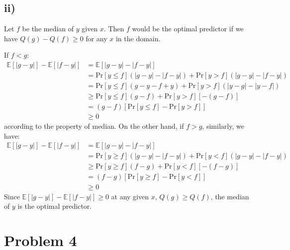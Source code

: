 \documentclass[twoside,11pt]{homework}
\begin{document}
\subsection*{ii)}
Let $f$ be the median of $y$ given $x$.
Then $f$ would be the optimal predictor if we have $Q(g) - Q(f) \ge 0$ for any $x$ in the domain.

If $f < g$:
%
\begin{equation}
\begin{split}
\mathbb{E}[|g-y|] - \mathbb{E}[|f-y|] &=  \mathbb{E}[|g-y| - |f-y|] \\
&= \mathrm{Pr}[y \le f] (|g-y| - |f-y|) + \mathrm{Pr}[y > f] (|g-y| - |f-y|) \\
&= \mathrm{Pr}[y \le f] (g - y - f + y) + \mathrm{Pr}[y > f] (|y-g| - |y-f|) \\
&\ge \mathrm{Pr}[y \le f] (g - f) + \mathrm{Pr}[y > f] [-(g-f)] \\
&= (g-f) [\mathrm{Pr}[y \le f]  -  \mathrm{Pr}[y > f]] \\
&\ge 0
\end{split}
\end{equation}
%
according to the property of median. 
On the other hand, if $f > g$, similarly, we have:
%
\begin{equation}
\begin{split}
\mathbb{E}[|g-y|] - \mathbb{E}[|f-y|] &=  \mathbb{E}[|g-y| - |f-y|] \\
&= \mathrm{Pr}[y \ge f] (|g-y| - |f-y|) + \mathrm{Pr}[y < f] (|g-y| - |f-y|)  \\
&\ge \mathrm{Pr}[y \ge f] (f-g) + \mathrm{Pr}[y < f] [-(f-g)] \\
&= (f-g) [\mathrm{Pr}[y \ge f]  -  \mathrm{Pr}[y < f]] \\
&\ge 0
\end{split}
\end{equation}
%
Since $\mathbb{E}[|g-y|] - \mathbb{E}[|f-y|] \ge 0$ at any given $x$, $Q(g) \ge Q(f)$, the median of $y$ is the optimal predictor.
 
\newpage
\section*{Problem 4}
\end{document}
